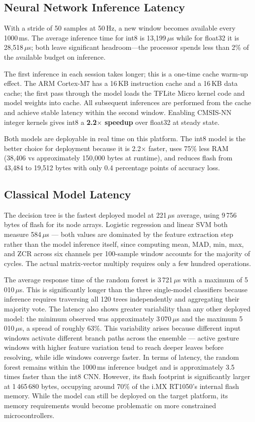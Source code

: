 \subsection{Neural Network Inference Latency}

With a stride of 50 samples at 50\,Hz, a new window becomes available every 1000\,ms. The average inference time for int8 is 13,199\,$\mu$s while for float32 it is 28,518\,$\mu$s; both leave significant headroom—the processor spends less than 2\% of the available budget on inference.

The first inference in each session takes longer; this is a one-time cache warm-up effect. The ARM Cortex-M7 has a 16\,KB instruction cache and a 16\,KB data cache; the first pass through the model loads the TFLite Micro kernel code and model weights into cache. All subsequent inferences are performed from the cache and achieve stable latency within the second window. Enabling CMSIS-NN integer kernels gives int8 a \textbf{2.2$\times$ speedup} over float32 at steady state. 

Both models are deployable in real time on this platform. The int8 model is the better choice for deployment because it is 2.2$\times$ faster, uses 75\% less RAM (38,406 vs approximately 150,000 bytes at runtime), and reduces flash from 43,484 to 19,512 bytes with only 0.4 percentage points of accuracy loss.

\subsection{Classical Model Latency}

The decision tree is the fastest deployed model at 221\,$\mu$s average, using 9\,756 bytes of flash for its node arrays. Logistic regression and linear SVM both measure 584\,$\mu$s — both values are dominated by the feature extraction step rather than the model inference itself, since computing mean, MAD, min, max, and ZCR across six channels per 100-sample window accounts for the majority of cycles. The actual matrix-vector multiply requires only a few hundred operations.

The average response time of the random forest is 3\,721\,$\mu$s with a maximum of 5\,010\,$\mu$s. This is significantly longer than the three single-model classifiers because inference requires traversing all 120 trees independently and aggregating their majority vote. The latency also shows greater variability than any other deployed model: the minimum observed was approximately 3\,070\,$\mu$s and the maximum 5\,010\,$\mu$s, a spread of roughly 63\%. This variability arises because different input windows activate different branch paths across the ensemble — active gesture windows with higher feature variation tend to reach deeper leaves before resolving, while idle windows converge faster. In terms of latency, the random forest remains within the 1000\,ms inference budget and is approximately 3.5 times faster than the int8 CNN. However, its flash footprint is significantly larger at 1\,465\,680 bytes, occupying around 70\% of the i.MX RT1050’s internal flash memory. While the model can still be deployed on the target platform, its memory requirements would become problematic on more constrained microcontrollers.

